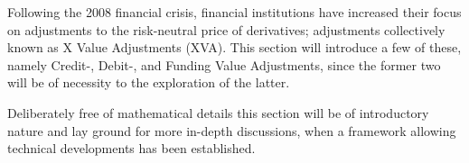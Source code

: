 \documentclass[main.tex]{subfiles}
\begin{document}
    Following the 2008 financial crisis,
    financial institutions have increased their focus on 
    adjustments to the risk-neutral price of derivatives;
    adjustments collectively known as X Value Adjustments (XVA).
    This section will introduce a few of these, 
    namely Credit-, Debit-, and Funding Value Adjustments,
    since the former two will be of necessity to the exploration of the latter.

    Deliberately free of mathematical details this section will be of introductory nature 
    and lay ground for more in-depth discussions, 
    when a framework allowing technical developments has been established.
\end{document}
